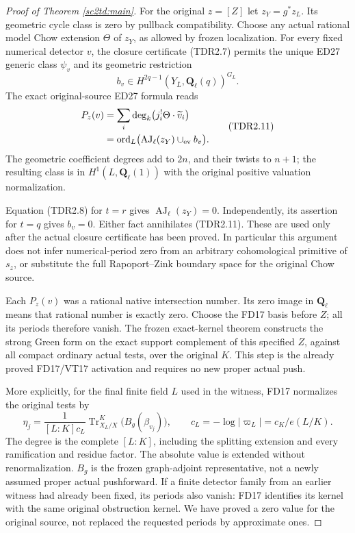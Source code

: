 \begin{proof}[Proof of Theorem \ref{sc2td:main}]
For the original $z=[Z]$ let $z_Y=g^*z_L$. Its geometric cycle class
is zero by pullback compatibility. Choose any actual rational model
Chow extension $\Theta$ of $z_Y$, as allowed by frozen localization.
For every fixed numerical detector $v$, the closure certificate
(TDR2.7) permits the unique ED27 generic class $\psi_v$ and its
geometric restriction
\[
 b_v\in H^{2q-1}(Y_{\bar L},\mathbf Q_\ell(q))^{G_L}.
\]
The exact original-source ED27 formula reads
\[
 \begin{split}
 P_z(v)
   &=\sum_i\deg_k\bigl(j_i^!\Theta\cdot\widetilde v_i\bigr)\\
   &=\operatorname{ord}_L\bigl(
       \operatorname{AJ}_\ell(z_Y)\cup_{\rm ev}b_v\bigr).
 \end{split}
 \tag{TDR2.11}
\]
The geometric coefficient degrees add to $2n$, and their twists to
$n+1$; the resulting class is in $H^1(L,\mathbf Q_\ell(1))$ with
the original positive valuation normalization.

Equation (TDR2.8) for $t=r$ gives
$\operatorname{AJ}_\ell(z_Y)=0$. Independently, its assertion for
$t=q$ gives $b_v=0$. Either fact annihilates (TDR2.11).
These are used only after the actual closure certificate has been
proved. In particular this argument does not infer numerical-period
zero from an arbitrary cohomological primitive of $s_z$, or substitute
the full Rapoport--Zink boundary space for the original Chow source.

Each $P_z(v)$ was a rational native intersection number. Its zero image
in $\mathbf Q_\ell$ means that rational number is exactly zero.
Choose the FD17 basis before $Z$; all its periods therefore vanish.
The frozen exact-kernel theorem constructs the strong Green form on
the exact support complement of this specified $Z$, against all compact
ordinary actual tests, over the original $K$. This step is the already
proved FD17/VT17 activation and requires no new proper actual push.

More explicitly, for the final finite field $L$ used in the witness,
FD17 normalizes the original tests by
\[
 \eta_j=\frac{1}{[L:K]c_L}
       \operatorname{Tr}_{X_L/X}^{K}\bigl(B_g(\beta_{v_j})\bigr),
 \qquad c_L=-\log|\varpi_L|=c_K/e(L/K).
 \tag{TDR2.12}
\]
The degree is the complete $[L:K]$, including the splitting extension
and every ramification and residue factor. The absolute value is
extended without renormalization. $B_g$ is the frozen graph-adjoint
representative, not a newly assumed proper actual pushforward.
If a finite detector family from an earlier witness had already been
fixed, its periods also vanish: FD17 identifies its kernel with the
same original obstruction kernel. We have proved a zero value for the
original source, not replaced the requested periods by approximate ones.
\end{proof}

